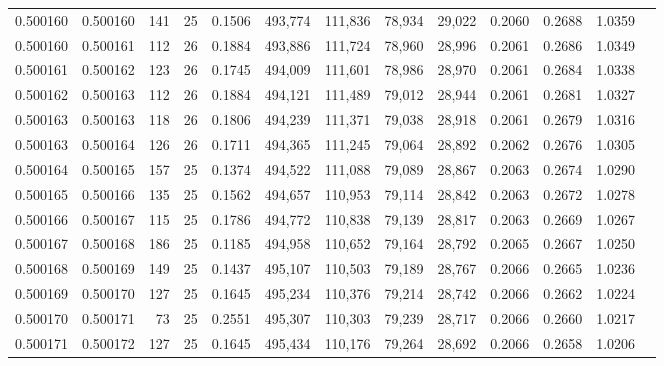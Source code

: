 \begin{tabular}{rrrrrrrrrrrrr}
0.500160 & 0.500160 & 141 &  25 &                                     0.1506 & 493,774 & 111,836 &  78,934 &  29,022 & 0.2060 & 0.2688 & 1.0359 \\
0.500160 & 0.500161 & 112 &  26 &                                     0.1884 & 493,886 & 111,724 &  78,960 &  28,996 & 0.2061 & 0.2686 & 1.0349 \\
0.500161 & 0.500162 & 123 &  26 &                                     0.1745 & 494,009 & 111,601 &  78,986 &  28,970 & 0.2061 & 0.2684 & 1.0338 \\
0.500162 & 0.500163 & 112 &  26 &                                     0.1884 & 494,121 & 111,489 &  79,012 &  28,944 & 0.2061 & 0.2681 & 1.0327 \\
0.500163 & 0.500163 & 118 &  26 &                                     0.1806 & 494,239 & 111,371 &  79,038 &  28,918 & 0.2061 & 0.2679 & 1.0316 \\
0.500163 & 0.500164 & 126 &  26 &                                     0.1711 & 494,365 & 111,245 &  79,064 &  28,892 & 0.2062 & 0.2676 & 1.0305 \\
0.500164 & 0.500165 & 157 &  25 &                                     0.1374 & 494,522 & 111,088 &  79,089 &  28,867 & 0.2063 & 0.2674 & 1.0290 \\
0.500165 & 0.500166 & 135 &  25 &                                     0.1562 & 494,657 & 110,953 &  79,114 &  28,842 & 0.2063 & 0.2672 & 1.0278 \\
0.500166 & 0.500167 & 115 &  25 &                                     0.1786 & 494,772 & 110,838 &  79,139 &  28,817 & 0.2063 & 0.2669 & 1.0267 \\
0.500167 & 0.500168 & 186 &  25 &                                     0.1185 & 494,958 & 110,652 &  79,164 &  28,792 & 0.2065 & 0.2667 & 1.0250 \\
0.500168 & 0.500169 & 149 &  25 &                                     0.1437 & 495,107 & 110,503 &  79,189 &  28,767 & 0.2066 & 0.2665 & 1.0236 \\
0.500169 & 0.500170 & 127 &  25 &                                     0.1645 & 495,234 & 110,376 &  79,214 &  28,742 & 0.2066 & 0.2662 & 1.0224 \\
0.500170 & 0.500171 &  73 &  25 &                                     0.2551 & 495,307 & 110,303 &  79,239 &  28,717 & 0.2066 & 0.2660 & 1.0217 \\
0.500171 & 0.500172 & 127 &  25 &                                     0.1645 & 495,434 & 110,176 &  79,264 &  28,692 & 0.2066 & 0.2658 & 1.0206 \\

\end{tabular}
